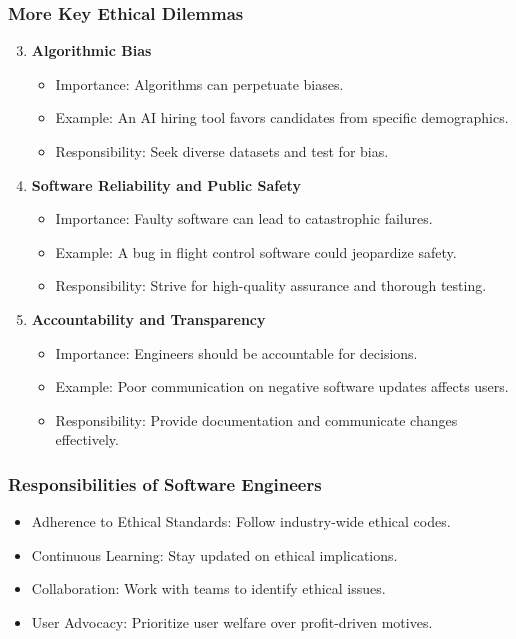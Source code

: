 \documentclass{beamer}
\begin{document}
\begin{frame}[fragile]
    \frametitle{More Key Ethical Dilemmas}
    \begin{enumerate}
        \setcounter{enumi}{2}
        \item \textbf{Algorithmic Bias}
            \begin{itemize}
                \item Importance: Algorithms can perpetuate biases.
                \item Example: An AI hiring tool favors candidates from specific demographics.
                \item Responsibility: Seek diverse datasets and test for bias.
            \end{itemize}
        
        \item \textbf{Software Reliability and Public Safety}
            \begin{itemize}
                \item Importance: Faulty software can lead to catastrophic failures.
                \item Example: A bug in flight control software could jeopardize safety.
                \item Responsibility: Strive for high-quality assurance and thorough testing.
            \end{itemize}
        
        \item \textbf{Accountability and Transparency}
            \begin{itemize}
                \item Importance: Engineers should be accountable for decisions.
                \item Example: Poor communication on negative software updates affects users.
                \item Responsibility: Provide documentation and communicate changes effectively.
            \end{itemize}
    \end{enumerate}
\end{frame}

\begin{frame}[fragile]
    \frametitle{Responsibilities of Software Engineers}
    \begin{itemize}
        \item Adherence to Ethical Standards: Follow industry-wide ethical codes.
        \item Continuous Learning: Stay updated on ethical implications.
        \item Collaboration: Work with teams to identify ethical issues.
        \item User Advocacy: Prioritize user welfare over profit-driven motives.
    \end{itemize}
\end{frame}
\end{document}
